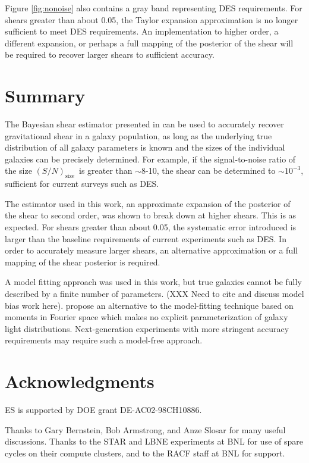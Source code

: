 \documentclass[12pt,preprint]{aastex}
\newcommand{\Tsn}{$(S/N)_{\textrm{size}}$}
\begin{document}
Figure \ref{fig:nonoise} also contains a gray band representing DES
requirements.  For shears greater than about 0.05, the Taylor expansion
approximation is no longer sufficient to meet DES requirements.  An
implementation to higher order, a different expansion, or perhaps a full
mapping of the posterior of the shear will be required to recover larger shears
to sufficient accuracy.

\section{Summary} \label{sec:summary}

The Bayesian shear estimator presented in \cite{ba13} can be used to accurately
recover gravitational shear in a galaxy population, as long as the underlying
true distribution of all galaxy parameters is known and the sizes of the
individual galaxies can be precisely determined.  For example, if the
signal-to-noise ratio of the size \Tsn\ is greater than $\sim$8-10, the shear
can be determined to $\sim10^{-3}$, sufficient for current surveys such as DES.

The estimator used in this work, an approximate expansion of the posterior of
the shear to second order, was shown to break down at higher shears. This is as
expected.  For shears greater than about 0.05, the systematic error introduced
is larger than the baseline requirements of current experiments such as DES.
In order to accurately measure larger shears, an alternative approximation or a
full mapping of the shear posterior is required.

A model fitting approach was used in this work, but true galaxies cannot be
fully described by a finite number of parameters. (XXX Need to cite and discuss
model bias work here). \cite{ba13} propose an alternative to the model-fitting
technique based on moments in Fourier space which makes no explicit
parameterization of galaxy light distributions.  Next-generation experiments
with more stringent accuracy requirements may require such a model-free
approach. 

\section*{Acknowledgments}

ES is supported by DOE grant DE-AC02-98CH10886.

Thanks to Gary Bernstein, Bob Armstrong, and Anze Slosar for many useful
discussions.  Thanks to the STAR and LBNE experiments at BNL for use of spare
cycles on their compute clusters, and to the RACF staff at BNL for support.




\end{document}
